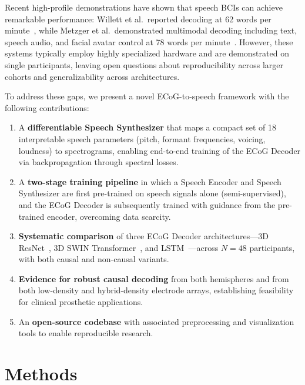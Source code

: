 \documentclass[11pt]{article}
\begin{document}
Recent high-profile demonstrations have shown that speech BCIs can achieve remarkable performance: Willett et al.\ reported decoding at 62 words per minute~\citep{willett2023high}, while Metzger et al.\ demonstrated multimodal decoding including text, speech audio, and facial avatar control at 78 words per minute~\citep{metzger2023high}. However, these systems typically employ highly specialized hardware and are demonstrated on single participants, leaving open questions about reproducibility across larger cohorts and generalizability across architectures.

To address these gaps, we present a novel ECoG-to-speech framework with the following contributions:

\begin{enumerate}
    \item A \textbf{differentiable Speech Synthesizer} that maps a compact set of 18 interpretable speech parameters (pitch, formant frequencies, voicing, loudness) to spectrograms, enabling end-to-end training of the ECoG Decoder via backpropagation through spectral losses.
    \item A \textbf{two-stage training pipeline} in which a Speech Encoder and Speech Synthesizer are first pre-trained on speech signals alone (semi-supervised), and the ECoG Decoder is subsequently trained with guidance from the pre-trained encoder, overcoming data scarcity.
    \item \textbf{Systematic comparison} of three ECoG Decoder architectures---3D ResNet~\citep{he2016deep}, 3D SWIN Transformer~\citep{liu2021swin}, and LSTM~\citep{hochreiter1997long}---across $N=48$ participants, with both causal and non-causal variants.
    \item \textbf{Evidence for robust causal decoding} from both hemispheres and from both low-density and hybrid-density electrode arrays, establishing feasibility for clinical prosthetic applications.
    \item An \textbf{open-source codebase} with associated preprocessing and visualization tools to enable reproducible research.
\end{enumerate}

\section{Methods}
\end{document}
